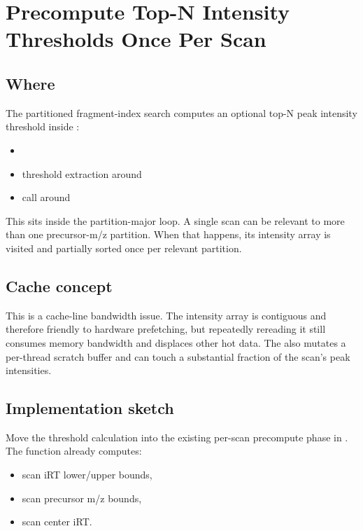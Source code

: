 \documentclass[11pt]{article}
\begin{document}
\section{Precompute Top-N Intensity Thresholds Once Per Scan}

\subsection*{Where}

The partitioned fragment-index search computes an optional top-N peak intensity
threshold inside :

\begin{itemize}
  \item {}
  \item threshold extraction around 
  \item {} call around 
\end{itemize}

This sits inside the partition-major loop. A single scan can be relevant to
more than one precursor-m/z partition. When that happens, its intensity array is
visited and partially sorted once per relevant partition.

\subsection*{Cache concept}

This is a cache-line bandwidth issue. The intensity array is contiguous and
therefore friendly to hardware prefetching, but repeatedly rereading it still
consumes memory bandwidth and displaces other hot data. The 
also mutates a per-thread scratch buffer and can touch a substantial fraction of
the scan's peak intensities.

\subsection*{Implementation sketch}

Move the threshold calculation into the existing per-scan precompute phase in
. The function already computes:

\begin{itemize}
  \item scan iRT lower/upper bounds,
  \item scan precursor m/z bounds,
  \item scan center iRT.
\end{itemize}
\end{document}
